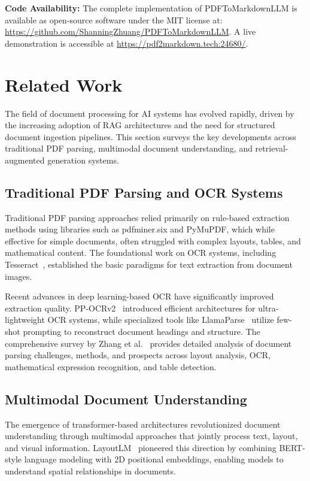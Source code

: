 \documentclass{article}
\begin{document}
\textbf{Code Availability:} The complete implementation of PDFToMarkdownLLM is available as open-source software under the MIT license at: \url{https://github.com/ShanningZhuang/PDFToMarkdownLLM}. A live demonstration is accessible at \url{https://pdf2markdown.tech:24680/}.

\section{Related Work}

The field of document processing for AI systems has evolved rapidly, driven by the increasing adoption of RAG architectures and the need for structured document ingestion pipelines. This section surveys the key developments across traditional PDF parsing, multimodal document understanding, and retrieval-augmented generation systems.

\subsection{Traditional PDF Parsing and OCR Systems}

Traditional PDF parsing approaches relied primarily on rule-based extraction methods using libraries such as pdfminer.six and PyMuPDF, which while effective for simple documents, often struggled with complex layouts, tables, and mathematical content. The foundational work on OCR systems, including Tesseract~\cite{smith2007tesseract}, established the basic paradigms for text extraction from document images.

Recent advances in deep learning-based OCR have significantly improved extraction quality. PP-OCRv2~\cite{du2020pp-ocrv2} introduced efficient architectures for ultra-lightweight OCR systems, while specialized tools like LlamaParse~\cite{llamaindex2024} utilize few-shot prompting to reconstruct document headings and structure. The comprehensive survey by Zhang et al.~\cite{zhang2024document} provides detailed analysis of document parsing challenges, methods, and prospects across layout analysis, OCR, mathematical expression recognition, and table detection.

\subsection{Multimodal Document Understanding}

The emergence of transformer-based architectures revolutionized document understanding through multimodal approaches that jointly process text, layout, and visual information. LayoutLM~\cite{xu2020layoutlm} pioneered this direction by combining BERT-style language modeling with 2D positional embeddings, enabling models to understand spatial relationships in documents.
\end{document}
